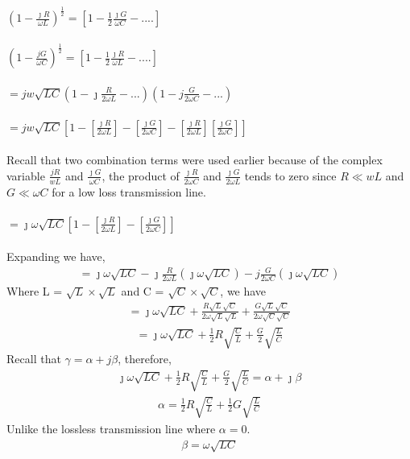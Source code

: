 $(1 - \frac{\jmath R}{\omega L})^{\frac{1}{2}} =[1 - \frac{1}{2}\frac{\jmath G}{\omega C} - ....]$\\\\
$(1 - \frac{jG}{\omega C})^{\frac{1}{2}} =[1 - \frac{1}{2}\frac{\jmath R}{\omega L} - ....]$\\\\
$= jw\sqrt{LC}(1 - \jmath \frac{R}{2\omega L} - ...)(1 - j\frac{G}{2\omega C} - ...)$\\\\
$= jw\sqrt{LC} [1- [\frac{\jmath R}{2\omega L}] - [\frac{\jmath G}{2\omega C}] -  [\frac{\jmath R}{2\omega L}][\frac{\jmath G}{2\omega C}]]$\\\\
Recall that two combination terms were used earlier because of the complex variable $\frac{jR}{wL}$ and $\frac{\jmath G}{\omega C}$, the product of $\frac{\jmath R}{2\omega C}$ and $\frac{\jmath G}{2\omega L}$ tends to zero since $R \ll wL$ and $G \ll \omega C$ for a low loss transmission line.\\\\
$= \jmath\omega\sqrt{LC} [1- [\frac{\jmath R}{2\omega L}] - [\frac{\jmath G}{2\omega C}]]$\\\\
Expanding we have,
\begin{align*}
= \jmath\omega\sqrt{LC} - \jmath\frac{R}{2\omega L}(\jmath\omega\sqrt{LC}) - j\frac{G}{2\omega C}(\jmath\omega\sqrt{LC})
\end{align*}
Where L = $\sqrt{L} \times \sqrt{L}$ and C = $\sqrt{C} \times \sqrt{C}$, we have
\begin{align*}
= \jmath\omega\sqrt{LC} + \frac{R\sqrt{L}\sqrt{C}}{2\omega\sqrt{L}\sqrt{L}} + \frac{G\sqrt{L}\sqrt{C}}{2\omega\sqrt{C}\sqrt{C}}
\end{align*}
\begin{align*}
= \jmath\omega\sqrt{LC} + \frac{1}{2}R\sqrt{\frac{C}{L}} + \frac{G}{2}\sqrt{\frac{L}{C}} 
\end{align*}
Recall that $\gamma = \alpha + j\beta$, therefore,
\begin{align*}
\jmath\omega\sqrt{LC} + \frac{1}{2}R\sqrt{\frac{C}{L}} + \frac{G}{2}\sqrt{\frac{L}{C}} = \alpha + \jmath\beta
\end{align*}
\begin{align}
\alpha = \frac{1}{2}R\sqrt{\frac{C}{L}} + \frac{1}{2}G\sqrt{\frac{L}{C}}
\end{align}
Unlike the lossless transmission line where $\alpha = 0$.
\begin{align}
\beta = \omega\sqrt{LC}
\end{align}

